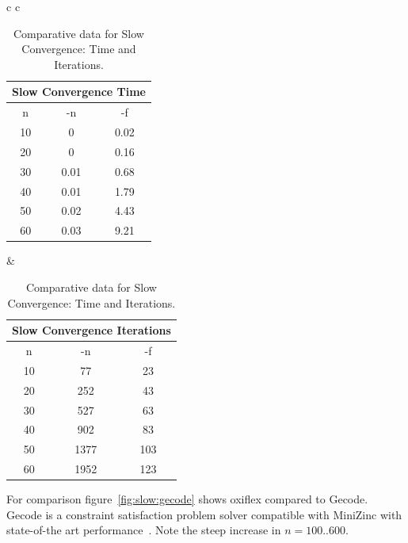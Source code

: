 \begin{table}[h!]
	\centering
	\begin{tabular}{c c}
		\begin{minipage}{.5\textwidth}
			\centering
			\begin{tabular}{| c | c | c |}
				\hline
				\multicolumn{3}{|c|}{Slow Convergence Time} \\ \hline
				n  & -n   & -f                              \\ \hline
				10 & 0    & 0.02                            \\ \hline
				20 & 0    & 0.16                            \\ \hline
				30 & 0.01 & 0.68                            \\ \hline
				40 & 0.01 & 1.79                            \\ \hline
				50 & 0.02 & 4.43                            \\ \hline
				60 & 0.03 & 9.21                            \\ \hline
			\end{tabular}
		\end{minipage} &
		\begin{minipage}{.5\textwidth}
			\centering
			\begin{tabular}{| c | c | c |}
				\hline
				\multicolumn{3}{|c|}{Slow Convergence Iterations} \\ \hline
				n  & -n   & -f                                    \\ \hline
				10 & 77   & 23                                    \\ \hline
				20 & 252  & 43                                    \\ \hline
				30 & 527  & 63                                    \\ \hline
				40 & 902  & 83                                    \\ \hline
				50 & 1377 & 103                                   \\ \hline
				60 & 1952 & 123                                   \\ \hline
			\end{tabular}
		\end{minipage}
	\end{tabular}
	\caption{Comparative data for Slow Convergence: Time and Iterations.}
	\label{tab:slow}
\end{table}

For comparison figure~\ref{fig:slow:gecode} shows oxiflex compared to Gecode. Gecode is a constraint satisfaction problem solver compatible with MiniZinc with state-of-the art performance~\cite{gecode}. Note the steep increase in $n = 100..600$.

